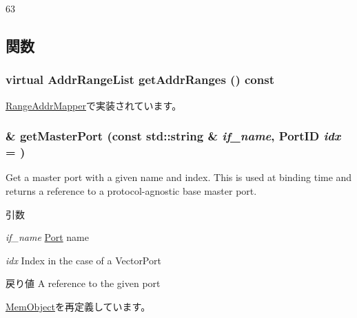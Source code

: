 \begin{DoxyCode}
63 { }
\end{DoxyCode}


\subsection{関数}
\hypertarget{classAddrMapper_a6e967f8921e80748eb2be35b6b481a7e}{
\subsubsection[{getAddrRanges}]{\setlength{\rightskip}{0pt plus 5cm}virtual {\bf AddrRangeList} getAddrRanges () const}}
\label{classAddrMapper_a6e967f8921e80748eb2be35b6b481a7e}


\hyperlink{classRangeAddrMapper_a36cf113d5e5e091ebddb32306c098fae}{RangeAddrMapper}で実装されています。\hypertarget{classAddrMapper_adc4e675e51defbdd1e354dac729d0703}{
\subsubsection[{getMasterPort}]{ \& getMasterPort (const std::string \& {\em if\_\-name}, \/  {\bf PortID} {\em idx} = {})}}
\label{classAddrMapper_adc4e675e51defbdd1e354dac729d0703}
Get a master port with a given name and index. This is used at binding time and returns a reference to a protocol-\/agnostic base master port.


\begin{DoxyParams}{引数}
\item[{\em if\_\-name}]\hyperlink{classPort}{Port} name \item[{\em idx}]Index in the case of a VectorPort\end{DoxyParams}
\begin{DoxyReturn}{戻り値}
A reference to the given port 
\end{DoxyReturn}


\hyperlink{classMemObject_adc4e675e51defbdd1e354dac729d0703}{MemObject}を再定義しています。


